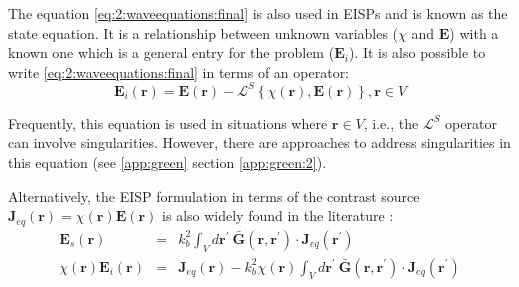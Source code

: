 			The equation \eqref{eq:2:waveequations:final} is also used in EISPs and is known as the state equation. It is a relationship between unknown variables ($\chi$ and $\mathbf{E}$) with a known one which is a general entry for the problem ($\mathbf{E}_i$). It is also possible to write \eqref{eq:2:waveequations:final}  in terms of an operator:
			\begin{equation}
				\mathbf{E}_i(\mathbf{r}) = \mathbf{E}(\mathbf{r}) - \mathcal{L}^S\left\{\chi(\mathbf{r}), \mathbf{E}(\mathbf{r})\right\}, \mathbf{r}\in V \label{eq:2:eisp:4}
			\end{equation}
		
			Frequently, this equation is used in situations where $\mathbf{r}\in V$, i.e., the $\mathcal{L}^S$ operator can involve singularities. However, there are approaches to address singularities in this equation (see \autoref{app:green} section \ref{app:green:2}).
			
			Alternatively, the EISP formulation in terms of the contrast source $\mathbf{J}_{eq}(\mathbf{r}) = \chi(\mathbf{r})\mathbf{E}(\mathbf{r})$ is also widely found in the literature \cite{berg1997constrast}:
			\begin{eqnarray}
				\mathbf{E}_s(\mathbf{r}) &=& k_b^2\int_V d\mathbf{r^\prime}~\mathbf{\bar{G}}(\mathbf{r},\mathbf{r^\prime})\cdot\mathbf{J}_{eq}(\mathbf{r^\prime}) \label{eq:2:eisp:5} \\
				\chi(\mathbf{r})\mathbf{E}_i(\mathbf{r}) &=& \mathbf{J}_{eq}(\mathbf{r}) - k_b^2\chi(\mathbf{r})\int_V d\mathbf{r^\prime}~\mathbf{\bar{G}}(\mathbf{r},\mathbf{r^\prime})\cdot\mathbf{J}_{eq}(\mathbf{r^\prime}) \label{eq:2:eisp:6}
			\end{eqnarray}
		
